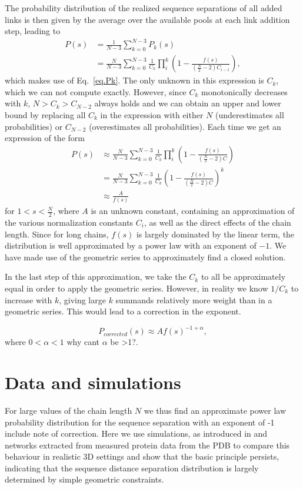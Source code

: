 \documentclass[reprint,amsmath,amssymb,rmp,onecolumn,notitlepage,11pt]{revtex4-1}
\newcommand{\red}[1]{\textcolor{red!80!black}{#1}}
\begin{document}
The probability distribution of the realized sequence separations of all added links is then given by the average over the available pools at each link addition step, leading to
\begin{align}
    P(s)&=\frac{1}{N-3}\sum_{k=0}^{N-3} P_k(s) \nonumber \\
    &= \frac{N}{N-3}\sum_{k=0}^{N-3} \frac{1}{C_k}\prod_{i}^k\left(1-\frac{f(s)}{(\frac{N}{2}-2)C_{i-1}} \right),
\end{align}
which makes use of Eq.~\ref{eq.Pk}. The only unknown in this expression is $C_k$, which we can not compute exactly. However, since $C_k$ monotonically decreases with $k$, $N>C_k>C_{N-2}$ always holds and we can obtain an upper and lower bound by replacing all $C_k$ in the expression with either $N$ (underestimates all probabilities) or $C_{N-2}$ (overestimates all probabilities). Each time we get an expression of the form 
\begin{align}
     P(s)&\approx\frac{N}{N-3}\sum_{k=0}^{N-3} \frac{1}{C_k}\prod_{i}^k\left(1-\frac{f(s)}{(\frac{N}{2}-2)C} \right)\nonumber \\
     &=\frac{N}{N-3} \sum_{k=0}^{N-3}\frac{1}{C_k}\left(1-\frac{f(s)}{(\frac{N}{2}-2)C} \right)^k \nonumber \\
     &\approx \frac{A}{f(s)}
\end{align}
for $1<s<\frac{N}{2}$,
where $A$ is an unknown constant, containing an approximation of the various normalization constants $C_i$, as well as the direct effects of the chain length. 
Since for long chains, $f(s)$ is largely dominated by the linear term, the distribution is well approximated by a power law with an exponent of $-1$. We have made use of the geometric series to approximately find a closed solution. 

In the last step of this approximation, we take the $C_k$ to all be approximately equal in order to apply the geometric series. However, in reality we know $1/C_k$ to increase with $k$, giving large $k$ summands relatively more weight than in a geometric series. This would lead to a correction in the exponent.

\begin{equation}
    P_{corrected}(s)\approx A f(s)^{-1+\alpha},
\end{equation}
where $0<\alpha<1$ \red{why cant $\alpha$ be >1?}.


\section*{Data and simulations}
 For large values of the chain length $N$ we thus find an approximate power law probability distribution for the sequence separation with an exponent of -1 \red{include note of correction}. Here we use simulations, as introduced in \cite{molkenthin2020self} and networks extracted from measured protein data from the PDB \cite{PDB} to compare this behaviour in realistic 3D settings and show that the basic principle persists, indicating that the sequence distance separation distribution is largely determined by simple geometric constraints.
 
\end{document}
